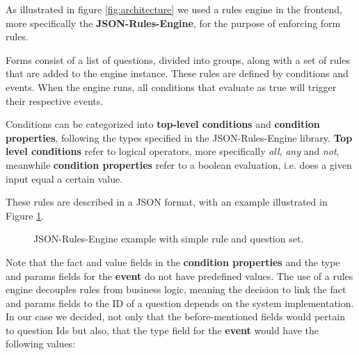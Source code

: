 As illustrated in figure \ref{fig:architecture} we used a rules engine in the frontend, more specifically the \textbf{JSON-Rules-Engine}, for the purpose of enforcing form rules.

Forms consist of a list of questions, divided into groups, along with a set of rules that are added to the engine instance. These rules are defined by conditions and events. When the engine runs, all conditions that evaluate as true will trigger their respective events.

Conditions can be categorized into \textbf{top-level conditions} and \textbf{condition properties}, following the types specified in the JSON-Rules-Engine library. 
\textbf{Top level conditions} refer to logical operators, more specifically \textit{all}, \textit{any} and \textit{not}, meanwhile \textbf{condition properties} refer to a boolean evaluation, i.e. does a given input equal a certain value.

These rules are described in a JSON format, with an example illustrated in Figure \ref{fig:jre_diagram}.

\begin{figure}[h]
	\begin{center}
	\end{center}
	\caption{JSON-Rules-Engine example with simple rule and question set.}\label{fig:jre_diagram}
\end{figure}

Note that the fact and value fields in the \textbf{condition properties} and the type and params fields for the \textbf{event} do not have predefined values. The use of a rules engine decouples rules from business logic, meaning the decision to link the fact and params fields to the ID of a question depends on the system implementation.
In our case we decided, not only that the before-mentioned fields would pertain to question Ids but also, that the type field for the \textbf{event} would have the following values:

